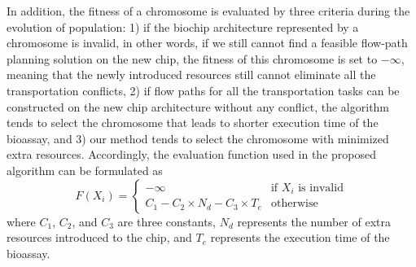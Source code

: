 In addition, the fitness of a chromosome is evaluated by three criteria during the evolution of population:
1) if the biochip architecture represented by a chromosome is invalid, in other words, if we still cannot find a feasible flow-path planning solution on the new chip, the fitness of this chromosome is set to $-\infty$, meaning that the newly introduced resources still cannot eliminate all the transportation conflicts, 2) if flow paths for all the transportation tasks can be constructed on the new chip architecture without any conflict, the algorithm tends to select the chromosome that leads to shorter execution time of the bioassay, and 3) our method tends to select the chromosome with minimized extra resources. Accordingly, the evaluation function used in the proposed algorithm can be formulated as
\begin{equation}\label{eq:fitness}
  F(X_i) =
  \begin{cases}
    -\infty & \text{if $X_i$ is invalid}\\
    C_1-C_2\times N_d-C_3\times T_e & \text{otherwise}
  \end{cases}
\end{equation}
where $C_1$, $C_2$, and $C_3$ are three constants, $N_d$ represents the number of extra resources introduced to the chip, and $T_e$ represents the execution time of the bioassay.

